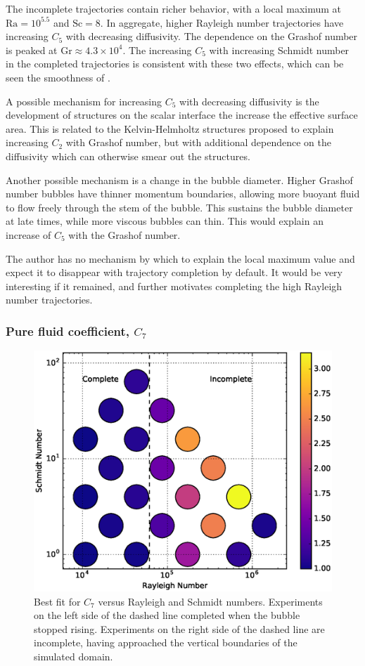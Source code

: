The incomplete trajectories contain richer behavior, with a local maximum at $\text{Ra} = 10^{5.5}$ and $\text{Sc} = 8$.
In aggregate, higher Rayleigh number trajectories have increasing $C_5$ with decreasing diffusivity.
The dependence on the Grashof number is peaked at $\text{Gr} \approx 4.3 \times 10^4$.
The increasing $C_5$ with increasing Schmidt number in the completed trajectories is consistent with these two effects, which can be seen the smoothness of .

A possible mechanism for increasing $C_5$ with decreasing diffusivity is the development of structures on the scalar interface the increase the effective surface area.
This is related to the Kelvin-Helmholtz structures proposed to explain increasing $C_2$ with Grashof number, but with additional dependence on the diffusivity which can otherwise smear out the structures.

Another possible mechanism is a change in the bubble diameter.
Higher Grashof number bubbles have thinner momentum boundaries, allowing more buoyant fluid to flow freely through the stem of the bubble.
This sustains the bubble diameter at late times, while more viscous bubbles can thin.
This would explain an increase of $C_5$ with the Grashof number.

The author has no mechanism by which to explain the local maximum value and expect it to disappear with trajectory completion by default.
It would be very interesting if it remained, and further motivates completing the high Rayleigh number trajectories.

\subsubsection{Pure fluid coefficient, $C_7$}
\begin{figure}
\includegraphics[width=\columnwidth]{figs/C7-vs-Rayleigh-Schmidt}
\caption{ 
  Best fit for $C_7$ versus Rayleigh and Schmidt numbers.
  Experiments on the left side of the dashed line completed when the bubble stopped rising.
  Experiments on the right side of the dashed line are incomplete, having approached the vertical boundaries of the simulated domain.
}
\end{figure}


